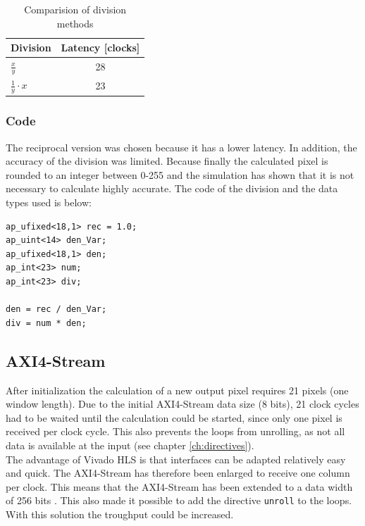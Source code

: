 \begin{table}[tb!]
    \centering
    \begin{tabular}{l c}
        \toprule
        Division & Latency [clocks]  \\
        \midrule
        $\frac{x}{y}$ & 28 
        \\
        $\frac{1}{y} \cdot x$ & 23 
        \\
        \bottomrule
    \end{tabular}
    \caption{Comparision of division methods}
    \label{tab:c_div}
\end{table}

\subsubsection*{Code}
The reciprocal version was chosen because it has a lower latency. In addition,
the accuracy of the division was limited. Because finally the calculated pixel
is rounded to an integer between 0-255 and the simulation has shown that it is
not necessary to calculate highly accurate. The code of the division and the data types used is below:

\begin{minipage}{\textwidth}
\begin{lstlisting}[style=CStyle, caption=Calculation of the division for the Wallis filter, label=lst:division]
ap_ufixed<18,1> rec = 1.0;
ap_uint<14> den_Var;
ap_ufixed<18,1> den;
ap_int<23> num;
ap_int<23> div;

den = rec / den_Var;
div = num * den;
\end{lstlisting}
\end{minipage}


\subsection{AXI4-Stream} \label{ch:ip:axi}
After initialization the calculation of a new output pixel
requires 21 pixels (one window length). Due to the initial AXI4-Stream data size
(8 bits), 21 clock cycles had to be waited until the calculation could be
started, since only one pixel is received per clock cycle. This also prevents
the loops from unrolling, as not all data is available at the input (see chapter \ref{ch:directives}). \\
The advantage of Vivado HLS is that interfaces can be adapted relatively easy
and quick. The AXI4-Stream has therefore been enlarged to receive one column per
clock. This means that the AXI4-Stream has been extended to a data width of 256
bits \cite{axi_stream}. This also made it possible to add the directive 
\texttt{unroll} to the loops. With this solution the troughput could be
increased.

